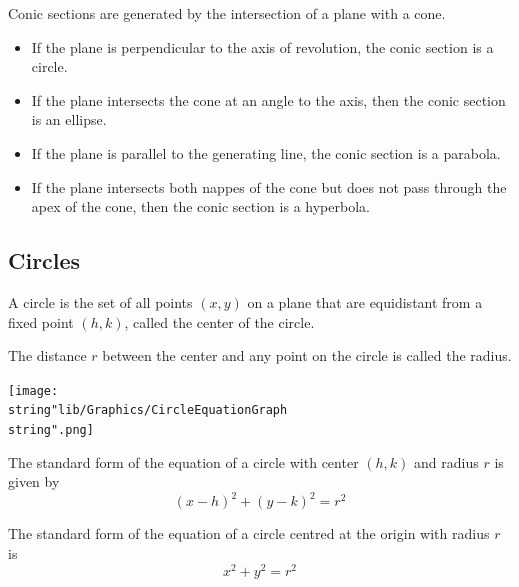 \documentclass[11pt,a4paper]{book}
\begin{document}
Conic sections are generated by the intersection of a plane with a
cone.
\begin{itemize}
\item If the plane is perpendicular to the axis of revolution, the conic
section is a circle.
\item If the plane intersects the cone at an angle to the axis, then the conic section is an ellipse.
\item If the plane is parallel to the generating line, the conic section
is a parabola.
\item If the plane intersects both nappes of the cone but does not pass through the apex of the cone, then the conic section is a hyperbola.
\end{itemize}


\subsection{Circles}

\begin{minipage}{0.64\textwidth}

A circle is the set of all points $\left(x,y\right)$ on a plane that
are equidistant from a fixed point $\left(h,k\right)$, called the
center of the circle.

The distance $r$ between the center and any point on the circle is
called the radius.

\end{minipage}
\begin{minipage}[t]{0.35\textwidth}
\begin{center}
\texttt{[image: \\string"lib/Graphics/CircleEquationGraph\\string".png]}
\par\end{center}

\end{minipage}

\begin{tcolorbox}[colback=blue!5, colframe=black,boxrule=.4pt, sharpish corners]

The standard form of the equation of a circle with center $\left(h,k\right)$
and radius $r$ is given by
\[
\left(x-h\right)^{2}+\left(y-k\right)^{2}=r^{2}
\]

The standard form of the equation of a circle centred at the origin
with radius $r$ is
\[
x^{2}+y^{2}=r^{2}
\]
\end{tcolorbox}
\end{document}

